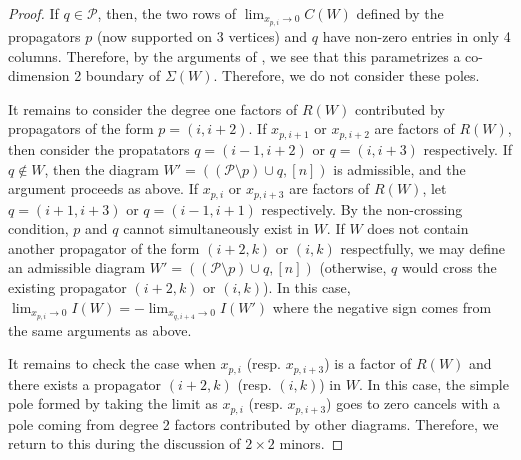 \documentclass[11pt]{article}
\newcommand{\cP}{\mathcal{P}}
\theoremstyle{remark}
\theoremstyle{definition}
\begin{document}
\begin{proof}
If $q \in \cP$, then, the two rows of $\lim_{x_{p, i} \rightarrow 0}C(W)$ defined by the propagators $p$ (now supported on 3 vertices) and $q$ have non-zero entries in only 4 columns. Therefore, by the arguments of \cite{basisshapeloci}, we see that this parametrizes a co-dimension 2 boundary of $\Sigma(W)$. Therefore, we do not consider these poles. 

It remains to consider the degree one factors of $R(W)$ contributed by propagators of the form $p = (i, i+2)$. If $x_{p, i+1}$ or $x_{p, i+2}$ are factors of $R(W)$, then consider the propatators $q = (i-1, i+2)$ or $q = (i, i+3)$ respectively. If $q \not \in W$, then the diagram $W' = ((\cP \setminus p)\cup q, [n])$ is admissible, and the argument proceeds as above. If $x_{p, i}$ or $x_{p, i+3}$ are factors of $R(W)$, let $q = (i+1, i+3)$ or $q = (i-1, i+1)$ respectively. By the non-crossing condition, $p$ and $q$ cannot simultaneously exist in $W$. If $W$ does not contain another propagator of the form $(i+2, k)$ or $(i, k)$ respectfully, we may define an admissible diagram $W' = ((\cP \setminus p)\cup q, [n])$ (otherwise, $q$ would cross the existing propagator $(i+2, k)$ or $(i, k)$).  In this case, $\lim_{x_{p, i} \rightarrow 0} I(W) = -\lim_{x_{q, i+4} \rightarrow 0} I(W')$ where the negative sign comes from the same arguments as above. 

It remains to check the case when $x_{p, i}$ (resp. $x_{p, i+3}$) is a factor of $R(W)$ and there exists a propagator $(i+2, k)$ (resp. $(i, k)$) in $W$. In this case, the simple pole formed by taking the limit as $x_{p, i}$ (resp. $x_{p, i+3}$) goes to zero cancels with a pole coming from degree 2 factors contributed by other diagrams. Therefore, we return to this during the discussion of $2 \times 2$ minors. 


\end{proof}
\end{document}
